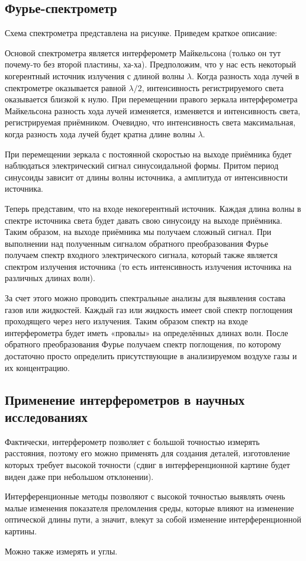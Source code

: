 \subsection{Фурье-спектрометр}

Схема спектрометра представлена на рисунке. Приведем краткое описание: %

Основой спектрометра является интерферометр Майкельсона (только он тут почему-то без второй пластины, ха-ха). Предположим, что у нас есть некоторый когерентный источник излучения с длиной волны $\lambda$. Когда разность хода лучей в спектрометре оказывается равной $\lambda/2$, интенсивность регистрируемого света оказывается близкой к нулю. При перемещении правого зеркала интерферометра Майкельсона разность хода лучей изменяется, изменяется и интенсивность света, регистрируемая приёмником. Очевидно, что интенсивность света максимальная, когда разность хода лучей будет кратна длине волны $\lambda$.

При перемещении зеркала с постоянной скоростью на выходе приёмника будет наблюдаться электрический сигнал синусоидальной формы. Притом период синусоиды зависит от длины волны источника, а амплитуда от интенсивности источника.

Теперь представим, что на входе некогерентный источник. Каждая длина волны в спектре источника света будет давать свою синусоиду на выходе приёмника. Таким образом, на выходе приёмника мы получаем сложный сигнал. При выполнении над полученным сигналом обратного преобразования Фурье получаем спектр входного электрического сигнала, который также является спектром излучения источника (то есть интенсивность излучения источника на различных длинах волн).

За счет этого можно проводить спектральные анализы для выявления состава газов или жидкостей. Каждый газ или жидкость имеет свой спектр поглощения проходящего через него излучения. Таким образом спектр на входе интерферометра будет иметь «провалы» на определённых длинах волн. После обратного преобразования Фурье получаем спектр поглощения, по которому достаточно просто определить присутствующие в анализируемом воздухе газы и их концентрацию.

\subsection{Применение интерферометров в научных исследованиях}

Фактически, интерферометр позволяет с большой точностью измерять расстояния, поэтому его можно применять для создания деталей, изготовление которых требует высокой точности (сдвиг в интерференционной картине будет виден даже при небольшом отклонении).

Интерференционные методы позволяют с высокой точностью выявлять очень малые изменения показателя преломления среды, которые влияют на изменение оптической длины пути, а значит, влекут за собой изменение интерференционной картины.

Можно также измерять и углы.